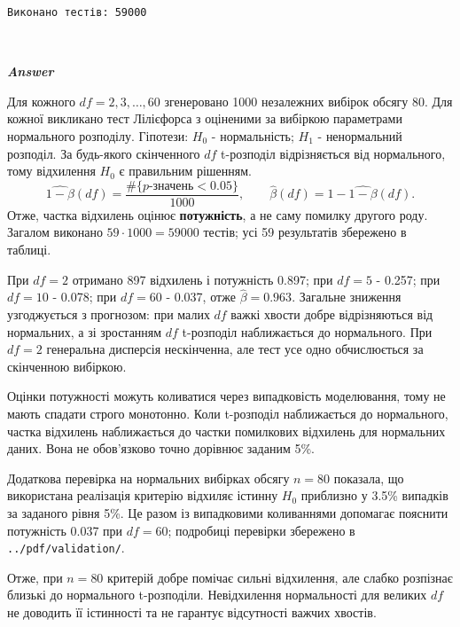 \documentclass[11pt]{article}
\begin{document}
    
    \begin{Verbatim}[commandchars=\\\{\}]
Виконано тестів: 59000
    \end{Verbatim}

    \begin{center}
    \end{center}
    { \hspace*{\fill} \\}
    
    \textbf{\emph{Answer}}

Для кожного \(df=2,3,\ldots,60\) згенеровано 1000 незалежних вибірок
обсягу 80. Для кожної викликано тест Лілієфорса з оціненими за вибіркою
параметрами нормального розподілу. Гіпотези: \(H_0\) - нормальність;
\(H_1\) - ненормальний розподіл. За будь-якого скінченного \(df\)
t-розподіл відрізняється від нормального, тому відхилення \(H_0\) є
правильним рішенням.
\[\widehat{1-\beta}(df)=\frac{\#\{p\text{-значень}<0.05\}}{1000},\qquad\widehat\beta(df)=1-\widehat{1-\beta}(df).\]
Отже, частка відхилень оцінює \textbf{потужність}, а не саму помилку
другого роду. Загалом виконано \(59\cdot1000=59000\) тестів; усі 59
результатів збережено в таблиці.

При \(df=2\) отримано 897 відхилень і потужність 0.897; при \(df=5\) -
0.257; при \(df=10\) - 0.078; при \(df=60\) - 0.037, отже
\(\widehat\beta=0.963\). Загальне зниження узгоджується з прогнозом: при
малих \(df\) важкі хвости добре відрізняються від нормальних, а зі
зростанням \(df\) t-розподіл наближається до нормального. При \(df=2\)
генеральна дисперсія нескінченна, але тест усе одно обчислюється за
скінченною вибіркою.

Оцінки потужності можуть коливатися через випадковість моделювання, тому
не мають спадати строго монотонно. Коли t-розподіл наближається до
нормального, частка відхилень наближається до частки помилкових
відхилень для нормальних даних. Вона не обов'язково точно дорівнює
заданим 5\%.

Додаткова перевірка на нормальних вибірках обсягу \(n=80\) показала, що
використана реалізація критерію відхиляє істинну \(H_0\) приблизно у
3.5\% випадків за заданого рівня 5\%. Це разом із випадковими
коливаннями допомагає пояснити потужність 0.037 при \(df=60\); подробиці
перевірки збережено в \texttt{../pdf/validation/}.

Отже, при \(n=80\) критерій добре помічає сильні відхилення, але слабко
розпізнає близькі до нормального t-розподіли. Невідхилення нормальності
для великих \(df\) не доводить її істинності та не гарантує відсутності
важчих хвостів.


    
    
    
\end{document}
